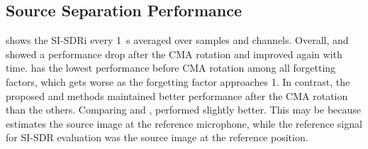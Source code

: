 \documentclass[sip,biber]{now-journal}
\begin{document}
\subsection{Source Separation Performance}

 shows the SI-SDRi every \SI{1}{\second} averaged over samples and channels.
Overall, \NaiveIVA{} and \ResetIVA{} showed a performance drop after the CMA rotation and improved again with time.
\ResetIVA{} has the lowest performance before CMA rotation among all forgetting factors, which gets worse as the forgetting factor approaches 1.
In contrast, the proposed \SFIIVAm{} and \SFIIVAo{} methods maintained better performance after the CMA rotation than the others.
Comparing \SFIIVAm{} and \SFIIVAo{}, \SFIIVAm{} performed slightly better.
This may be because \SFIIVAo{} estimates the source image at the reference microphone, while the reference signal for SI-SDR evaluation was the source image at the reference position.
\end{document}
